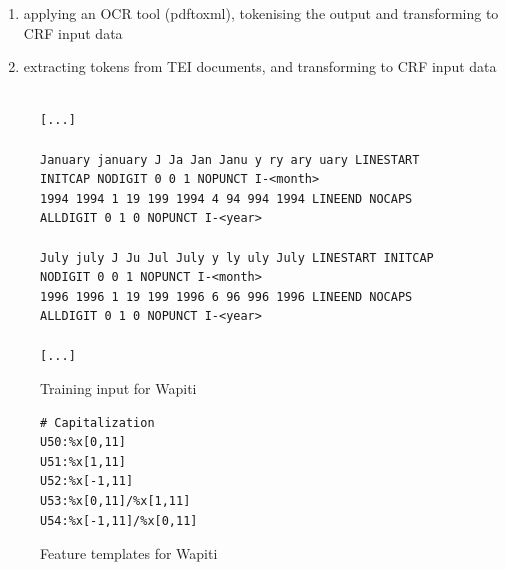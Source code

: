 \documentclass[11pt, oneside]{scrartcl}   	%
\begin{document}
\begin{enumerate}
\item applying an OCR tool (pdftoxml), tokenising the output and transforming to CRF input data
\item extracting tokens from TEI documents, and transforming to CRF input data
\end{enumerate}

\begin{figure}
\begin{verbatim}

[...]

January january J Ja Jan Janu y ry ary uary LINESTART INITCAP NODIGIT 0 0 1 NOPUNCT I-<month>
1994 1994 1 19 199 1994 4 94 994 1994 LINEEND NOCAPS ALLDIGIT 0 1 0 NOPUNCT I-<year>
 
July july J Ju Jul July y ly uly July LINESTART INITCAP NODIGIT 0 0 1 NOPUNCT I-<month>
1996 1996 1 19 199 1996 6 96 996 1996 LINEEND NOCAPS ALLDIGIT 0 1 0 NOPUNCT I-<year>

[...]

\end{verbatim}
\caption{Training input for Wapiti}
\label{fig:traininput}
\end{figure}

\begin{figure}
\begin{verbatim}
# Capitalization
U50:%x[0,11]
U51:%x[1,11]
U52:%x[-1,11]
U53:%x[0,11]/%x[1,11]
U54:%x[-1,11]/%x[0,11]
\end{verbatim}

\caption{Feature templates for Wapiti}
\label{fig:template}
\end{figure}
\end{document}

